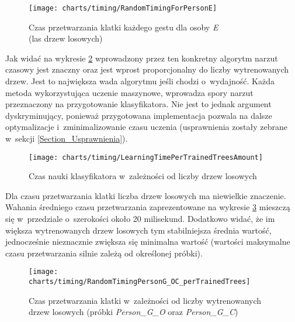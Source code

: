       \begin{figure}[!ht]
        \centering
        \texttt{[image: charts/timing/RandomTimingForPersonE]}
        \caption[Czas przetwarzania klatki każdego gestu dla osoby E (las drzew losowych)]
                {Czas przetwarzania klatki każdego gestu dla osoby \textit{E}\\(las drzew losowych)}
        \label{fig:RandomTimingForPersonE}
      \end{figure}

    \newpage
    Jak widać na wykresie \ref{fig:LearningTime} wprowadzony przez ten konkretny algorytm narzut czasowy jest znaczny oraz jest wprost proporcjonalny do liczby wytrenowanych drzew. Jest to największa wada algorytmu jeśli chodzi o~wydajność. Każda metoda wykorzystująca uczenie maszynowe, wprowadza spory narzut przeznaczony na przygotowanie klasyfikatora. Nie jest to jednak argument dyskryminujący, ponieważ przygotowana implementacja pozwala na dalsze optymalizacje i~zminimalizowanie czasu uczenia (usprawnienia zostały zebrane w~sekcji \ref{Section_Usprawnienia}).

      \begin{figure}[!ht]
        \centering
        \texttt{[image: charts/timing/LearningTimePerTrainedTreesAmount]}
        \caption[Czas nauki klasyfikatora w~zależności od liczby drzew losowych]
                {Czas nauki klasyfikatora w~zależności od liczby drzew losowych}
        \label{fig:LearningTime}
      \end{figure}

    Dla czasu przetwarzania klatki liczba drzew losowych ma niewielkie znaczenie. Wahania średniego czasu przetwarzania zaprezentowane na wykresie \ref{fig:TimingPerTrainedTreesAmount} mieszczą się w~przedziale o~szerokości około 20 milisekund. Dodatkowo widać, że im większa wytrenowanych drzew losowych tym stabilniejsza średnia wartość, jednocześnie nieznacznie zwiększa się minimalna wartość (wartości maksymalne czasu przetwarzania silnie zależą od określonej próbki).

      \begin{figure}[!ht]
        \centering
        \texttt{[image: charts/timing/RandomTimingPersonG\_OC\_perTrainedTrees]}
        \caption[Czas przetwarzania klatki w~zależności od liczby wytrenowanych drzew losowych]
                {Czas przetwarzania klatki w~zależności od liczby wytrenowanych drzew losowych (próbki \textit{Person\_G\_O} oraz \textit{Person\_G\_C})}
        \label{fig:TimingPerTrainedTreesAmount}
      \end{figure}

